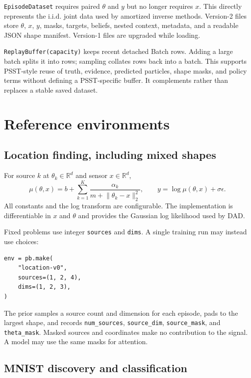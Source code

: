 \documentclass[11pt]{article}
\begin{document}
\texttt{EpisodeDataset} requires paired $\theta$ and $y$ but no longer requires
$x$. This directly represents the i.i.d. joint data used by amortized inverse
methods. Version-2 files store $\theta$, $x$, $y$, masks, targets, beliefs, nested
context, metadata, and a readable JSON shape manifest. Version-1 files are upgraded
while loading.

\texttt{ReplayBuffer(capacity)} keeps recent detached Batch rows. Adding a large
batch splits it into rows; sampling collates rows back into a batch. This supports
PSST-style reuse of truth, evidence, predicted particles, shape masks, and policy
terms without defining a PSST-specific buffer. It complements rather than replaces
a stable saved dataset.

\section{Reference environments}

\subsection{Location finding, including mixed shapes}

For source $k$ at $\theta_k\in\mathbb R^d$ and sensor $x\in\mathbb R^d$,
\begin{equation}
  \mu(\theta,x)
  =b+\sum_{k=1}^{K}\frac{\alpha_k}
  {m+\lVert\theta_k-x\rVert_2^2},
  \qquad
  y=\log\mu(\theta,x)+\sigma\epsilon.
\end{equation}
All constants and the log transform are configurable. The implementation is
differentiable in $x$ and $\theta$ and provides the Gaussian log likelihood used
by DAD.

Fixed problems use integer \texttt{sources} and \texttt{dims}. A single training
run may instead use choices:
\begin{lstlisting}
env = pb.make(
    "location-v0",
    sources=(1, 2, 4),
    dims=(1, 2, 3),
)
\end{lstlisting}
The prior samples a source count and dimension for each episode, pads to the largest
shape, and records \texttt{num\_sources}, \texttt{source\_dim},
\texttt{source\_mask}, and \texttt{theta\_mask}. Masked sources and coordinates
make no contribution to the signal. A model may use the same masks for attention.

\subsection{MNIST discovery and classification}
\end{document}
